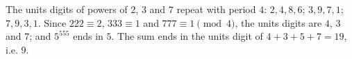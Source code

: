 The units digits of powers of $2$, $3$ and $7$ repeat with period $4$: $2,4,8,6$; $3,9,7,1$; $7,9,3,1$. Since $222\equiv2$, $333\equiv1$ and $777\equiv1\pmod4$, the units digits are $4$, $3$ and $7$; and $5^{555}$ ends in $5$. The sum ends in the units digit of $4+3+5+7=19$, i.e. $\boxed{9}$.
